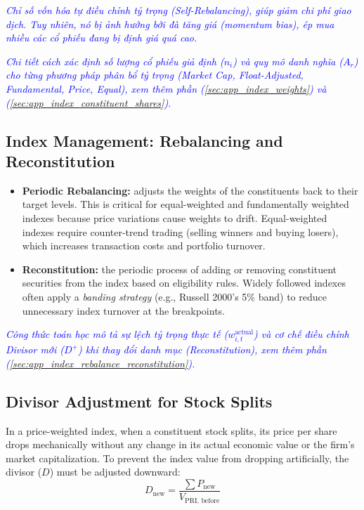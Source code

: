 \textcolor{blue}{\textit{Chỉ số vốn hóa tự điều chỉnh tỷ trọng (Self-Rebalancing), giúp giảm chi phí giao dịch. Tuy nhiên, nó bị ảnh hưởng bởi đà tăng giá (momentum bias), ép mua nhiều các cổ phiếu đang bị định giá quá cao.}}

\textcolor{blue}{\textit{Chi tiết cách xác định số lượng cổ phiếu giả định ($n_i$) và quy mô danh nghĩa ($A_r$) cho từng phương pháp phân bổ tỷ trọng (Market Cap, Float-Adjusted, Fundamental, Price, Equal), xem thêm phần (\ref{sec:app_index_weights}) và (\ref{sec:app_index_constituent_shares}).}}

\subsection{Index Management: Rebalancing and Reconstitution}
	\label{subsec:Index Management: Rebalancing and Reconstitution}
\begin{itemize}
	\item \textbf{Periodic Rebalancing:} adjusts the weights of the constituents back to their target levels. This is critical for equal-weighted and fundamentally weighted indexes because price variations cause weights to drift. Equal-weighted indexes require counter-trend trading (selling winners and buying losers), which increases transaction costs and portfolio turnover.
	\item \textbf{Reconstitution:} the periodic process of adding or removing constituent securities from the index based on eligibility rules. Widely followed indexes often apply a \textit{banding strategy} (e.g., Russell 2000's 5\% band) to reduce unnecessary index turnover at the breakpoints.
\end{itemize}

\textcolor{blue}{\textit{Công thức toán học mô tả sự lệch tỷ trọng thực tế ($w_{i,t}^{\text{actual}}$) và cơ chế điều chỉnh Divisor mới ($D^+$) khi thay đổi danh mục (Reconstitution), xem thêm phần (\ref{sec:app_index_rebalance_reconstitution}).}}


\subsection{Divisor Adjustment for Stock Splits}
	\label{subsec:Divisor Adjustment for Stock Splits}
In a price-weighted index, when a constituent stock splits, its price per share drops mechanically without any change in its actual economic value or the firm's market capitalization. To prevent the index value from dropping artificially, the divisor ($D$) must be adjusted downward:
\begin{equation}
	D_{\text{new}} = \frac{\sum P_{\text{new}}}{V_{\text{PRI, before}}}
	\label{eq:divisor_adjustment}
\end{equation}

